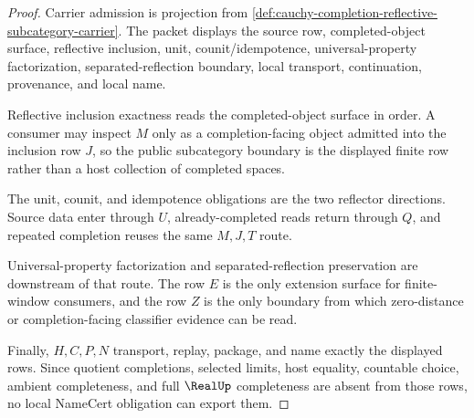 \begin{proof}
Carrier admission is projection from \autoref{def:cauchy-completion-reflective-subcategory-carrier}. The packet displays the source row, completed-object surface, reflective inclusion, unit, counit/idempotence, universal-property factorization, separated-reflection boundary, local transport, continuation, provenance, and local name.

Reflective inclusion exactness reads the completed-object surface in order. A consumer may inspect $M$ only as a completion-facing object admitted into the inclusion row $J$, so the public subcategory boundary is the displayed finite row rather than a host collection of completed spaces.

The unit, counit, and idempotence obligations are the two reflector directions. Source data enter through $U$, already-completed reads return through $Q$, and repeated completion reuses the same $M,J,T$ route.

Universal-property factorization and separated-reflection preservation are downstream of that route. The row $E$ is the only extension surface for finite-window consumers, and the row $Z$ is the only boundary from which zero-distance or completion-facing classifier evidence can be read.

Finally, $H,C,P,N$ transport, replay, package, and name exactly the displayed rows. Since quotient completions, selected limits, host equality, countable choice, ambient completeness, and full $\RealUp$ completeness are absent from those rows, no local NameCert obligation can export them.
\end{proof}

